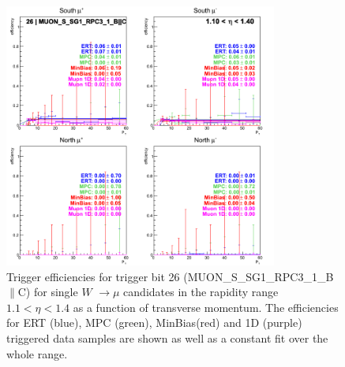 \begin{figure}[h!]

  \centering

  \includegraphics[width=0.8\textwidth]{./figures/run13_trigeffipt_eta0_trig26_lin.png}
  \caption{\label{fig:run13_trigeffipt_eta0_nper0_trig26_lin} Trigger efficiencies for trigger bit 26 (MUON\_S\_SG1\_RPC3\_1\_B$\|$C) for single $W$ $\rightarrow \mu$ candidates in the rapidity range $ 1.1 < \eta < 1.4$ as a function of transverse momentum. The efficiencies for ERT (blue), MPC (green), MinBias(red) and 1D (purple) triggered data samples are shown as well as a constant fit over the whole range.}

\end{figure}
\clearpage
